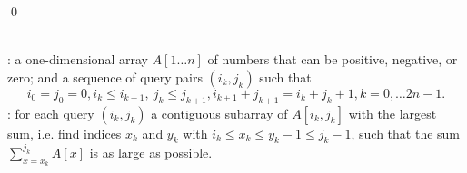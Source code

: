 \qed
\begin{problem}\label{p.msmm}\ \\
	: a one-dimensional array $A[1\ldots n]$ of numbers
	that can be positive, negative, or zero; and a sequence of query pairs $(i_k,j_k)$ 
	such that 
	$$i_0=j_0=0, i_k\leq  i_{k+1},\  j_k \leq j_{k+1}, 
	i_{k+1}+j_{k+1}=i_k+j_k+1,
	k=0, \ldots 2n-1.$$
	: for each query $(i_k,j_k)$ a contiguous subarray of 
	$A[i_k,j_k]$ with the largest sum,
	i.e. find indices $x_k$ and 
	$y_k$ with $i_k \leq x_k\leq y_k-1\leq j_k-1$, such that the sum
	$ \sum_{x=x_k}^{j_k}A[x] $
	is as large as possible. 
\end{problem}

% 



